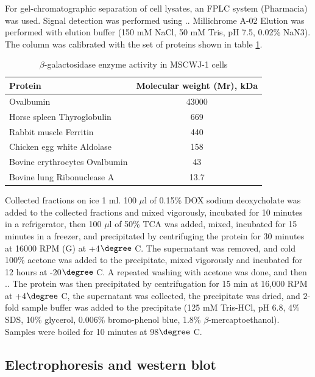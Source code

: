 \documentclass[english,authoryear]{elsarticle}
\begin{document}
For gel-chromatographic separation of cell lysates, an FPLC system (Pharmacia) was used.
Signal detection was performed using .. Millichrome A-02
Elution was performed with elution buffer (150 mM NaCl, 50 mM Tris, pH 7.5, 0.02\% NaN3).
The column was calibrated with the set of proteins shown in table \ref{calibration}.

\begin{table}
  \caption{$\beta$-galactosidase enzyme activity in MSCWJ-1 cells}
  \label{calibration}
\centering
\begin{tabular}{l|c|}
 Protein & Molecular weight (Mr), kDa  \\
 \hline
 Ovalbumin & 43000 \\
 Horse spleen Thyroglobulin & 669 \\
 Rabbit muscle Ferritin & 440 \\
 Chicken egg white Aldolase & 158 \\
 Bovine erythrocytes Ovalbumin & 43 \\
 Bovine lung Ribonuclease A & 13.7
\end{tabular}
\end{table}

Collected fractions on ice 1 ml.
100 $\mu$l of 0.15\% DOX sodium deoxycholate was added to the collected fractions and mixed vigorously, incubated for 10 minutes in a refrigerator, then 100 $\mu$l of 50\% TCA was added, mixed, incubated for 15 minutes in a freezer, and precipitated by centrifuging the protein for 30 minutes at 16000 RPM (G) at +4$\degree$ C.
The supernatant was removed, and cold 100\% acetone was added to the precipitate, mixed vigorously and incubated for 12 hours at -20$\degree$ C. A repeated washing with acetone was done, and then ..
The protein was then precipitated by centrifugation for 15 min at 16,000 RPM at +4$\degree$ C, the supernatant was collected, the precipitate was dried, and 2-fold sample buffer was added to the precipitate (125 mM Tris-HCl, pH 6.8, 4\% SDS, 10\% glycerol, 0.006\% bromo-phenol blue, 1.8\% $\beta$-mercaptoethanol).
Samples were boiled for 10 minutes at 98$\degree$ C.

\subsection{Electrophoresis and western blot}
\end{document}
